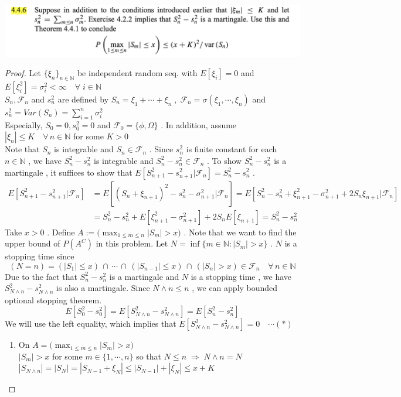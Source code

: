 \documentclass[12pt, A4]{article}
\newcommand{\N}{\mathbb{N}}
\newcommand{\F}{\mathcal{F}}
\newcommand{\intersect}{\,\cap\,}
\newcommand{\foranyn}{\quad \forall \, n\in \N}
\begin{document}
\includegraphics[width=17cm]{Exer4.4.6.png}
\begin{proof}
    Let $\{\xi_n\}_{n\in\N}$ be independent random seq. with $E[\xi_i]=0$ and $E[\xi_i^2]=\sigma_i^2<\infty\quad \forall\;i\in \N$ \\ $S_n, \F_n$ and $s_n^2$ are defined by $S_n=\xi_1+\cdots +\xi_n\;,\; \F_n=\sigma(\xi_1, \cdots, \xi_n)$ and $s_n^2=Var(S_n)=\sum_{i=1}^n \sigma_i^2$ \\Especially, $S_0=0, s_0^2=0$ and $\F_0=\{\phi, \Omega\}$ . In addition, assume $|\xi_n|\leq K\foranyn$ for some $K>0$ \\ Note that $S_n$ is integrable and $S_n\in\F_n$ . Since $s_n^2$ is finite constant for each $n\in\N$ , we have $S_n^2-s_n^2$ is integrable and $S_n^2-s_n^2\in \F_n$ . To show $S_n^2-s_n^2$ is a martingale , it suffices to show that $E[S_{n+1}^2-s_{n+1}^2|\F_n]=S_n^2-s_n^2$ . 
    \begin{align*}
        E[S_{n+1}^2-s_{n+1}^2|\F_n]&= E[(S_n+\xi_{n+1})^2-s_n^2-\sigma_{n+1}^2|\F_n] = E[S_n^2-s_n^2+\xi_{n+1}^2-\sigma_{n+1}^2+2S_n\xi_{n+1}|\F_n] \\
        &= S_n^2-s_n^2+E[\xi_{n+1}^2-\sigma_{n+1}^2]+2S_nE[\xi_{n+1}] = S_n^2-s_n^2
    \end{align*}
    Take $x>0$ . Define $A:=\big(\max_{1\leq m \leq n}|S_m|>x\big)$ . Note that we want to find the upper bound of $P(A^C)$ in this problem. Let $N=\inf\{m\in \N : |S_m|>x\}$ . $N$ is a stopping time since $$(N=n)=(|S_1|\leq x)\intersect \cdots \intersect (|S_{n-1}|\leq x)\intersect (|S_n|>x)\in \F_n \foranyn$$
    Due to the fact that $S_n^2-s_n^2$ is a martingale and $N$ is a stopping time , we have $S_{N\wedge n}^2-s_{N\wedge n}^2$ is also a martingale. Since $N\wedge n\leq n$ , we can apply bounded optional stopping theorem. $$E[S_0^2-s_0^2]=E[S_{N\wedge n}^2-s_{N\wedge n}^2]=E[S_n^2-s_n^2] $$ We will use the left equality, which implies that $E[S_{N\wedge n}^2-s_{N\wedge n}^2]=0\quad \cdots (*)$
    \begin{enumerate}
        \item On $A=\big(\max_{1\leq m \leq n}|S_m|>x\big)$ \\ $|S_m|>x$ for some $m\in \{1,\cdots, n\}$ so that $N\leq n\;\Rightarrow \; N\wedge n=N$ \\ $|S_{N\wedge n}|=|S_N|=|S_{N-1}+\xi_N|\leq |S_{N-1}|+|\xi_N|\leq x+K$

\end{enumerate}
\end{proof}
\end{document}
